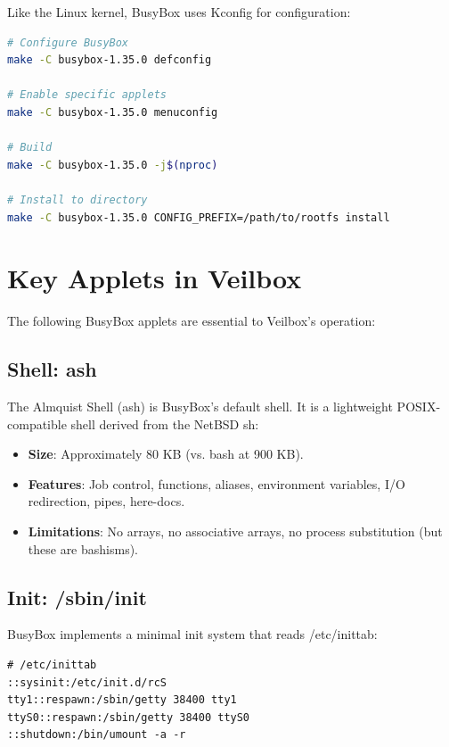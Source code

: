 Like the Linux kernel, BusyBox uses Kconfig for configuration:

\begin{lstlisting}[language=bash]
# Configure BusyBox
make -C busybox-1.35.0 defconfig

# Enable specific applets
make -C busybox-1.35.0 menuconfig

# Build
make -C busybox-1.35.0 -j$(nproc)

# Install to directory
make -C busybox-1.35.0 CONFIG_PREFIX=/path/to/rootfs install
\end{lstlisting}

\section{Key Applets in Veilbox}

The following BusyBox applets are essential to Veilbox's operation:

\subsection{Shell: ash}

The Almquist Shell (ash) is BusyBox's default shell. It is a lightweight
POSIX-compatible shell derived from the NetBSD sh:

\begin{itemize}[nosep]
  \item \textbf{Size}: Approximately 80 KB (vs. bash at 900 KB).
  \item \textbf{Features}: Job control, functions, aliases, environment
        variables, I/O redirection, pipes, here-docs.
  \item \textbf{Limitations}: No arrays, no associative arrays, no
        process substitution (but these are bashisms).
\end{itemize}

\subsection{Init: /sbin/init}

BusyBox implements a minimal init system that reads /etc/inittab:

\begin{lstlisting}
# /etc/inittab
::sysinit:/etc/init.d/rcS
tty1::respawn:/sbin/getty 38400 tty1
ttyS0::respawn:/sbin/getty 38400 ttyS0
::shutdown:/bin/umount -a -r
\end{lstlisting}

